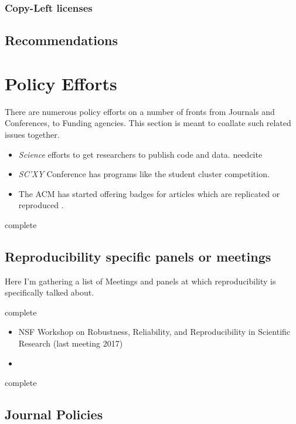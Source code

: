 \documentclass[american]{article}
\newcommand{\complete}{
	\gls{complete}
}
\newcommand{\needcite}{
	\gls{needcite}
}
\begin{document}
\subsubsection{Copy-Left licenses} \label{sec:legal-licensing-left}

\subsection{Recommendations} \label{sec:legal-recommendations}

\section{Policy Efforts} \label{sec:policy}

There are numerous policy efforts on a number of fronts from Journals and Conferences, to Funding agencies. This section is meant to coallate such related issues together.

\begin{itemize}
\item \textit{Science} efforts to get researchers to publish code and data. \needcite
\item \textit{SC'XY} Conference has programs like the student cluster competition. \cite{sighpc-connect-repro-1,sighpc-connect-repro-2}
\item The ACM has started offering badges for articles which are replicated or reproduced \cite{acm-badging-announcement}.
\end{itemize}

\complete

\subsection{Reproducibility specific panels or meetings} \label{sec:policy-panels}

Here I'm gathering a list of Meetings and panels at which reproducibility is specifically talked about.

\complete

\begin{itemize}
\item NSF Workshop on Robustness, Reliability, and Reproducibility in Scientific Research (last meeting 2017)
\item
\end{itemize}

\complete

\subsection{Journal Policies} \label{sec:policy-journals}
\end{document}

